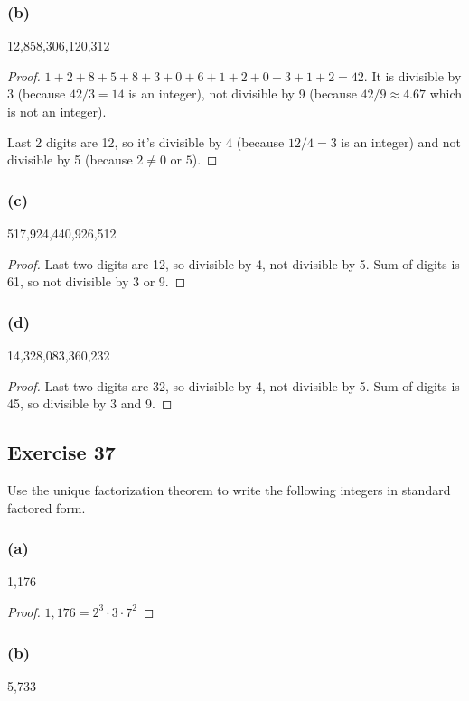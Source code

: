 \documentclass[14pt]{extarticle}
\begin{document}
\subsubsection{(b)}
12,858,306,120,312

\begin{proof}
    $1+2+8+5+8+3+0+6+1+2+0+3+1+2=42$. It is divisible by 3 (because $42 / 3 = 14$ is an integer), not divisible by 9 (because $42/9 \approx 4.67$ which is not an integer).

    Last 2 digits are 12, so it's divisible by 4 (because $12/4 = 3 $ is an integer) and not divisible by 5 (because $2 \neq 0$ or $5$).
\end{proof}

\subsubsection{(c)}
517,924,440,926,512

\begin{proof}
    Last two digits are 12, so divisible by 4, not divisible by 5. Sum of digits is 61, so not divisible by 3 or 9.
\end{proof}

\subsubsection{(d)}
14,328,083,360,232

\begin{proof}
    Last two digits are 32, so divisible by 4, not divisible by 5. Sum of digits is 45, so divisible by 3 and 9.
\end{proof}

\subsection{Exercise 37}
Use the unique factorization theorem to write the following integers in standard factored form.

\subsubsection{(a)}
1,176

\begin{proof}
    $1,176 = 2^3 \cdot 3 \cdot 7^2$
\end{proof}

\subsubsection{(b)}
5,733
\end{document}
